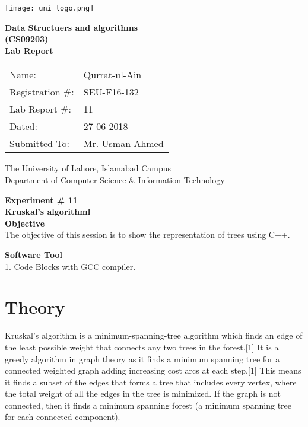 \documentclass[11pt]{article}            %
\begin{document}
\begin{titlepage}
    \centering
  \vfill
    \texttt{[image: uni\_logo.png]} \\ 
	\vskip2cm
    {\bfseries\Large
	Data Structuers and algorithms \\ (CS09203)\\
	
	\vskip2cm
	Lab Report 
	 
	\vskip2cm
	}    

\begin{center}
\begin{tabular}{ l l  } 

Name: & Qurrat-ul-Ain\\ 
Registration \#: & SEU-F16-132 \\ 
Lab Report \#: & 11 \\ 
 Dated:& 27-06-2018\\ 
Submitted To:& Mr. Usman Ahmed\\ 

\end{tabular}
\end{center}
    \vfill
    The University of Lahore, Islamabad Campus\\
Department of Computer Science \& Information Technology
\end{titlepage}


    
    {\bfseries\Large
\centering
	Experiment \# 11 \\

Kruskal's algorithml \\
	
	}    
 \vskip1cm
 \textbf {Objective}\\ The objective of this session is to show the representation of trees using C++. 
 
 \textbf {Software Tool} \\
 1. Code Blocks with GCC compiler.

\section{Theory }              

Kruskal's algorithm is a minimum-spanning-tree algorithm which finds an edge of the least possible weight that connects any two trees in the forest.[1] It is a greedy algorithm in graph theory as it finds a minimum spanning tree for a connected weighted graph adding increasing cost arcs at each step.[1] This means it finds a subset of the edges that forms a tree that includes every vertex, where the total weight of all the edges in the tree is minimized. If the graph is not connected, then it finds a minimum spanning forest (a minimum spanning tree for each connected component).
\end{document}
